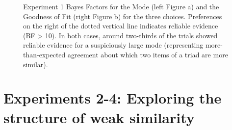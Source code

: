 \documentclass[doc]{apa6}
\begin{document}
\begin{figure}[t]
  \centering
  \caption{\small{Experiment 1 Bayes Factors for the Mode (left Figure a) and the Goodness of Fit (right Figure b) for the three choices. Preferences on the right of the dotted vertical line indicates reliable evidence (BF > 10). In both cases, around two-thirds of the trials showed reliable evidence for a suspiciously large mode (representing more-than-expected agreement about which two items of a triad are more similar).}}
\end{figure}

\bigskip

\section{Experiments 2-4: Exploring the structure of weak similarity}
\end{document}
